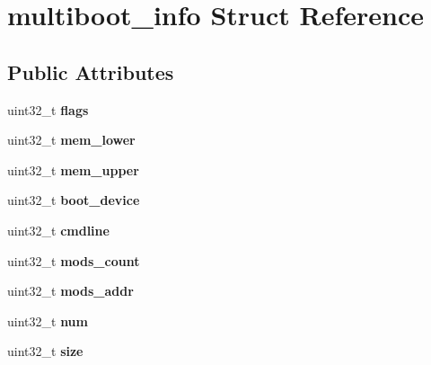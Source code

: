\hypertarget{structmultiboot__info}{}\section{multiboot\+\_\+info Struct Reference}
\label{structmultiboot__info}
\subsection*{Public Attributes}
\begin{DoxyCompactItemize}
\item 
\mbox{\label{structmultiboot__info_a33c78eb1aec2573f8293acf9a42fe2a8}} 
uint32\+\_\+t {\bfseries flags}
\item 
\mbox{\label{structmultiboot__info_a8c88b721d871cb57a51feb5cd5fbdb6c}} 
uint32\+\_\+t {\bfseries mem\+\_\+lower}
\item 
\mbox{\label{structmultiboot__info_a8ecb8953e55d1f6b75a3892cdc82a0b5}} 
uint32\+\_\+t {\bfseries mem\+\_\+upper}
\item 
\mbox{\label{structmultiboot__info_a25cb7fc3488f632d68e2ecaf760a09f4}} 
uint32\+\_\+t {\bfseries boot\+\_\+device}
\item 
\mbox{\label{structmultiboot__info_aac1e78293233aa63654d4c0161820201}} 
uint32\+\_\+t {\bfseries cmdline}
\item 
\mbox{\label{structmultiboot__info_ae5805a4dc5565e41584401485242e14e}} 
uint32\+\_\+t {\bfseries mods\+\_\+count}
\item 
\mbox{\label{structmultiboot__info_a9cd295e9a71d935757d6899119228e1b}} 
uint32\+\_\+t {\bfseries mods\+\_\+addr}
\item 
\mbox{\label{structmultiboot__info_a139657928e701730c0457758d9ce34e7}} 
uint32\+\_\+t {\bfseries num}
\item 
\mbox{\label{structmultiboot__info_aadac321d6d87633c34b64130528a597d}} 
uint32\+\_\+t {\bfseries size}

\end{DoxyCompactItemize}
